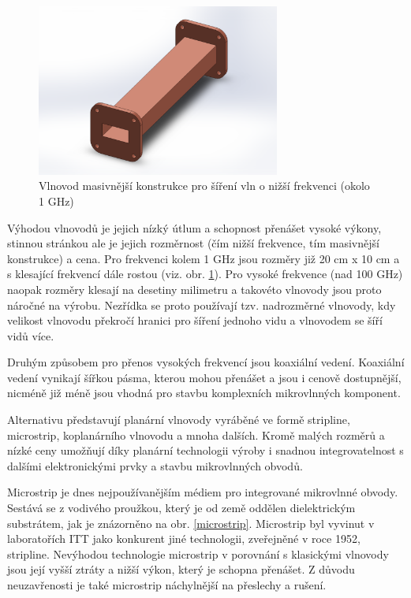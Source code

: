 \documentclass[12pt,a4paper,oneside]{article}
\numberwithin{equation}{section} %
\numberwithin{figure}{section} %
\numberwithin{table}{section} %
\begin{document}
\begin{figure}[h] 
\begin{center}
\includegraphics[width=8cm]{vlnovod.pdf}
\caption{Vlnovod masivnější konstrukce pro šíření vln o nižší frekvenci (okolo 1 GHz)}
\label{vlnovod}
\end{center}
\end{figure}

Výhodou vlnovodů je jejich nízký útlum a schopnost přenášet vysoké výkony, stinnou stránkou ale je jejich rozměrnost (čím nižší frekvence, tím masivnější konstrukce) a cena. Pro frekvenci kolem 1 GHz jsou rozměry již 20 cm x 10 cm a s klesající frekvencí dále rostou (viz. obr. \ref{vlnovod}). Pro vysoké frekvence (nad 100 GHz) naopak rozměry klesají na desetiny milimetru a takovéto vlnovody jsou proto náročné na výrobu. Nezřídka se proto používají tzv. nadrozměrné vlnovody, kdy velikost vlnovodu překročí hranici pro šíření jednoho vidu a vlnovodem se šíří vidů více. \cite{Dimensions}

Druhým způsobem pro přenos vysokých frekvencí jsou koaxiální vedení. Koaxiální vedení vynikají šířkou pásma, kterou mohou přenášet a jsou i cenově dostupnější, nicméně již méně jsou vhodná pro stavbu komplexních mikrovlnných komponent.

Alternativu představují planární vlnovody vyráběné ve formě stripline, microstrip, koplanárního vlnovodu a mnoha dalších. Kromě malých rozměrů a nízké ceny umožňují díky planární technologii výroby i snadnou integrovatelnost s dalšími elektronickými prvky a stavbu mikrovlnných obvodů.

Microstrip je dnes nejpoužívanějším médiem pro integrované mikrovlnné obvody. Sestává se z vodivého proužkou, který je od země oddělen dielektrickým substrátem, jak je znázorněno na obr. \ref{microstrip}. Microstrip byl vyvinut v laboratořích ITT jako konkurent jiné technologii, zveřejněné v roce 1952, stripline. Nevýhodou technologie microstrip v porovnání s klasickými vlnovody jsou její vyšší ztráty a nižší výkon, který je schopna přenášet. Z důvodu neuzavřenosti je také microstrip náchylnější na přeslechy a rušení.
\end{document}

